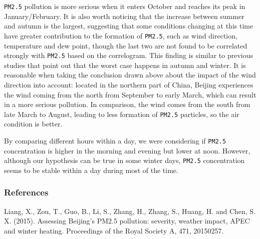\documentclass[]{article}
\begin{document}
\texttt{PM2.5} pollution is more serious when it enters October and
reaches its peak in January/February. It is also worth noticing that the
increase between summer and autumn is the largest, suggesting that some
conditions changing at this time have greater contribution to the
formation of \texttt{PM2.5}, such as wind direction, temperature and dew
point, though the last two are not found to be correlated strongly with
\texttt{PM2.5} based on the correlogram. This finding is similar to
previous studies that point out that the worst case happens in autumn
and winter. It is reasonable when taking the conclusion drawn above
about the impact of the wind direction into account: located in the
northern part of China, Beijing experiences the wind coming from the
north from September to early March, which can result in a more serious
pollution. In comparison, the wind comes from the south from late March
to August, leading to less formation of \texttt{PM2.5} particles, so the
air condition is better.

By comparing different hours within a day, we were considering if
\texttt{PM2.5} concentration is higher in the morning and evening but
lower at noon. However, although our hypothesis can be true in some
winter days, \texttt{PM2.5} concentration seems to be stable within a
day during most of the time.

\hypertarget{references}{%
\subsubsection{References}\label{references}}

Liang, X., Zou, T., Guo, B., Li, S., Zhang, H., Zhang, S., Huang, H. and
Chen, S. X. (2015). Assessing Beijing's PM2.5 pollution: severity,
weather impact, APEC and winter heating. Proceedings of the Royal
Society A, 471, 20150257.
\end{document}
